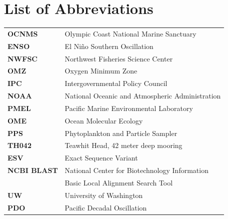 \documentclass[12pt,twoside]{reedthesis}
\begin{document}
	
    \chapter*{List of Abbreviations}

	\begin{table}[h]
	\centering %
	\begin{tabular}{ll}
		\textbf{OCNMS}  	&  Olympic Coast National Marine Sanctuary \\
		\textbf{ENSO}  	&  El Ni\~{n}o Southern Oscillation \\
		\textbf{NWFSC} & Northwest Fisheries Science Center \\
		\textbf{OMZ}  	&  Oxygen Minimum Zone \\
		\textbf{IPC}  	&  Intergovernmental Policy Council \\
		\textbf{NOAA}  	&  National Oceanic and Atmospheric Administration \\
		\textbf{PMEL}  	&  Pacific Marine Environmental Laboratory \\
		\textbf{OME}  	&  Ocean Molecular Ecology \\
		\textbf{PPS}  	&  Phytoplankton and Particle Sampler \\
		\textbf{TH042}  	&  Teawhit Head, 42 meter deep mooring \\
		\textbf{ESV}  	&  Exact Sequence Variant \\
		\textbf{NCBI BLAST}  	&  National Center for Biotechnology Information \\ 
		& Basic Local Alignment Search Tool  \\
		\textbf{UW}  	&  University of Washington  \\ 
		\textbf{PDO}  	&  Pacific Decadal Oscillation \\
	\end{tabular}
	\end{table}
	

    \tableofcontents
    \listoftables
    \listoffigures

\end{document}
